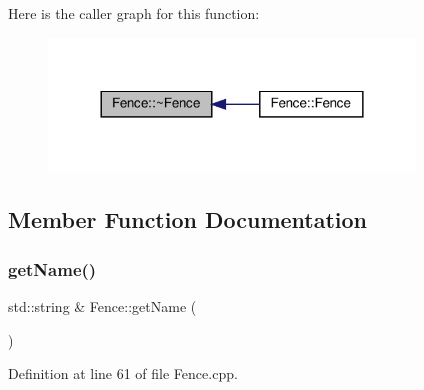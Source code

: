 Here is the caller graph for this function\+:\nopagebreak
\begin{figure}[H]
\begin{center}
\leavevmode
\includegraphics[width=276pt]{d0/db8/class_fence_a6c5e019535f94462bfab1ad19b865c55_icgraph}
\end{center}
\end{figure}


\subsection{Member Function Documentation}
\mbox{\label{class_fence_a1d90d0ff61bec6cda8240f6365fc5d28}} 
\subsubsection{\texorpdfstring{get\+Name()}{getName()}}
{\footnotesize\ttfamily std\+::string \& Fence\+::get\+Name (\begin{DoxyParamCaption}{ }\end{DoxyParamCaption})}



Definition at line 61 of file Fence.\+cpp.


